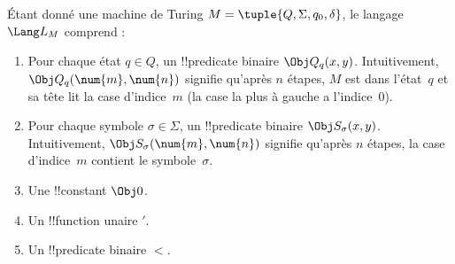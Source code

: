 \documentclass[../../../include/open-logic-section]{subfiles}
\begin{document}
\begin{defn}
Étant donné une machine de Turing $M=\tuple{Q,\Sigma,q_0,\delta}$,
le langage~$\Lang L_M$ comprend :
\begin{enumerate}
\item Pour chaque état $q\in Q$, un !!{predicate} binaire
  $\Obj Q_q(x,y)$. Intuitivement, $\Obj Q_q(\num{m},\num{n})$
  signifie qu'après $n$ étapes, $M$ est dans l'état~$q$ et sa tête
  lit la case d'indice~$m$ (la case la plus à gauche a l'indice~$0$).
\item Pour chaque symbole $\sigma\in\Sigma$, un !!{predicate}
  binaire $\Obj S_\sigma(x,y)$. Intuitivement,
  $\Obj S_\sigma(\num{m},\num{n})$ signifie qu'après $n$ étapes,
  la case d'indice~$m$ contient le symbole~$\sigma$.
\item Une !!{constant} $\Obj 0$.
\item Un !!{function} unaire $\prime$.
\item Un !!{predicate} binaire $<$.
\end{enumerate}
\end{defn}
\end{document}
